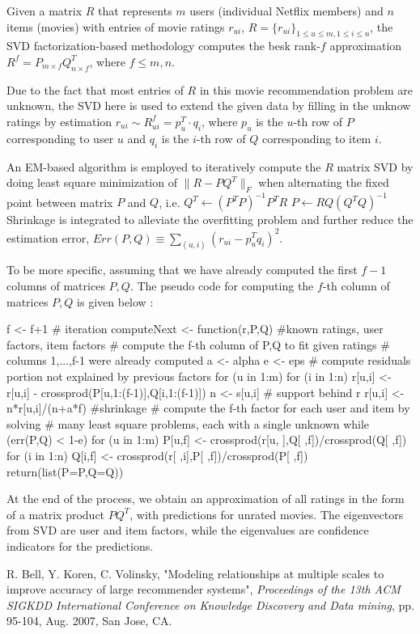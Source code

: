 \documentclass{article}
\begin{document}
Given a matrix $R$ that represents $m$ users (individual Netflix members) and $n$ items (movies)
with entries of movie ratings $r_{ui}$, $R=\{r_{ui}\}_{1\leq u\leq m, 1\leq i\leq n}$,
the SVD factorization-based methodology computes the besk rank-$f$ approximation
$R^f=P_{m\times f}Q_{n\times f}^T$, where $f\leq m,n$.

Due to the fact that most entries of $R$ in this movie recommendation problem are unknown,
the SVD here is used to extend the given data by filling in the unknow ratings by estimation 
$r_{ui} \sim R_{ui}^f = p_u^T \cdot q_i$, where $p_u$ is the $u$-th row of $P$ corresponding to user $u$
and $q_i$ is the $i$-th row of $Q$ corresponding to item $i$.

An EM-based algorithm is employed to iteratively compute the $R$ matrix SVD by doing
least square minimization of $\|R-PQ^T\|_F$ when alternating the fixed point between
matrix $P$ and $Q$, i.e. \newline
$Q^T \leftarrow (P^TP)^{-1}P^TR$ \newline
$P \leftarrow RQ(Q^TQ)^{-1}$\newline
Shrinkage is integrated to alleviate the overfitting problem and further reduce the estimation error,\newline
$Err(P,Q)\equiv \displaystyle\sum_{(u,i)}(r_{ui}-p_u^Tq_i)^2$.

To be more specific, assuming that we have already computed the first $f-1$ columns of
matrices $P,Q$. The pseudo code for computing the $f$-th column of matrices $P,Q$ is given below
\cite{KDD07}:

f <- f+1 # iteration
computeNext <- function(r,P,Q){ #known ratings, user factors, item factors
	# compute the f-th column of P,Q to fit given ratings
	# columns 1,...,f-1 were already computed
	a <- alpha
	e <- eps
	# compute residuals portion not explained by previous factors
	for (u in 1:m){
		for (i in 1:n){
			r[u,i] <- r[u,i] - crossprod(P[u,1:(f-1)],Q[i,1:(f-1)])
			n <- s[u,i] # support behind r
			r[u,i] <- n*r[u,i]/(n+a*f) #shrinkage
		}
	}
	# compute the f-th factor for each user and item by solving
	# many least square problems, each with a single unknown
	while (err(P,Q) < 1-e){
		for (u in 1:m){
			P[u,f] <- crossprod(r[u, ],Q[ ,f])/crossprod(Q[ ,f])
		}
		for (i in 1:n){
			Q[i,f] <- crossprod(r[ ,i],P[ ,f])/crossprod(P[ ,f])
		}
	}
	return(list(P=P,Q=Q))
}

At the end of the process, we obtain an approximation of all ratings in the form of a matrix product
$PQ^T$, with predictions for unrated movies. The eigenvectors from SVD are user and item factors, while
the eigenvalues are confidence indicators for the predictions.

\begin{thebibliography}{9}
 R. Bell, Y. Koren, C. Volinsky, 
"Modeling relationships at multiple scales to improve accuracy of large recommender systems",
\textit{Proceedings of the 13th ACM SIGKDD International Conference on Knowledge Discovery and Data mining},
pp. 95-104, Aug. 2007, San Jose, CA.
\end{thebibliography}
\end{document}
